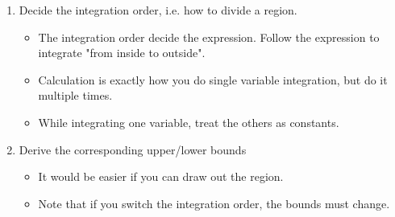 \documentclass[class=article, crop=false, 12pt]{standalone}
\begin{document}
\begin{enumerate}
    \item Decide the integration order, i.e. how to divide a region.
    \begin{itemize}
        
        \item The integration order decide the expression. Follow the expression to integrate "from inside to outside".
        \\

        \item Calculation is exactly how you do single variable integration, but do it multiple times. 
        \item While integrating one variable, treat the others as constants.
    \end{itemize}

    \item Derive the corresponding upper/lower bounds
    \begin{itemize}
        \item It would be easier if you can draw out the region.
        \item Note that if you switch the integration order, the bounds must change.
    \end{itemize}

\end{enumerate}
\end{document}
